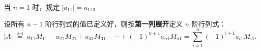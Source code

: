 \begin{definition}[$n$ 阶行列式的递推定义]
当 $n=1$ 时，规定 $|a_{11}|=a_{11}$。

设所有 $n-1$ 阶行列式的值已定义好，则按\textbf{第一列展开}定义 $n$ 阶行列式：
\[
|A|\;\overset{\mathrm{def}}{=}\;a_{11}M_{11}-a_{21}M_{21}+a_{31}M_{31}-\cdots+(-1)^{n+1}a_{n1}M_{n1}
=\sum_{i=1}^{n}(-1)^{i+1}a_{i1}M_{i1}.
\]
\end{definition}
